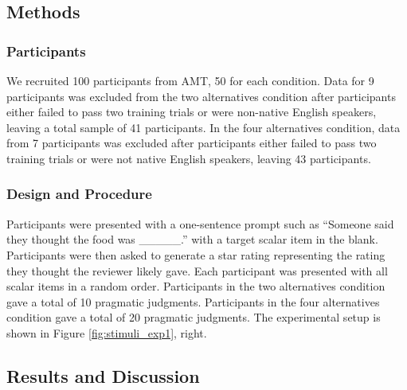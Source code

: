 \documentclass[10pt, letterpaper]{article}
\begin{document}
\subsection{Methods}\label{methods-2}

\subsubsection{Participants}\label{participants-2}

We recruited 100 participants from AMT, 50 for each condition. Data for
9 participants was excluded from the two alternatives condition after
participants either failed to pass two training trials or were
non-native English speakers, leaving a total sample of 41 participants.
In the four alternatives condition, data from 7 participants was
excluded after participants either failed to pass two training trials or
were not native English speakers, leaving 43 participants.

\subsubsection{Design and Procedure}\label{design-and-procedure-2}

Participants were presented with a one-sentence prompt such as ``Someone
said they thought the food was \_\_\_\_\_.'' with a target scalar item
in the blank. Participants were then asked to generate a star rating
representing the rating they thought the reviewer likely gave. Each
participant was presented with all scalar items in a random order.
Participants in the two alternatives condition gave a total of 10
pragmatic judgments. Participants in the four alternatives condition
gave a total of 20 pragmatic judgments. The experimental setup is shown
in Figure \ref{fig:stimuli_exp1}, right.

\subsection{Results and Discussion}\label{results-and-discussion-2}
\end{document}
